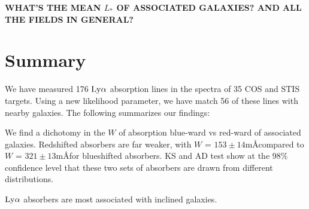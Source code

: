 \documentclass[iop]{emulateapj-rtx4}
\begin{document}
\textbf{WHAT'S THE MEAN $L_*$ OF ASSOCIATED GALAXIES? AND ALL THE FIELDS IN GENERAL?}

\section{Summary}

We have measured 176 $\rm Ly\alpha$ absorption lines in the spectra of 35 COS and STIS targets. Using a new likelihood parameter, we have match 56 of these lines with nearby galaxies. The following summarizes our findings:

\indent \textbullet \indent We find a dichotomy in the $W$ of absorption blue-ward vs red-ward of associated galaxies. Redshifted absorbers are far weaker, with $W$ = $153 \pm 14$m\AA compared to $W$ = $321 \pm 13$m\AA for blueshifted absorbers. KS and AD test show at the 98\% confidence level that these two sets of absorbers are drawn from different distributions. 

\textbullet \indent $\rm Ly\alpha$ absorbers are most associated with inclined galaxies.

\nocite{*}


\end{document}
